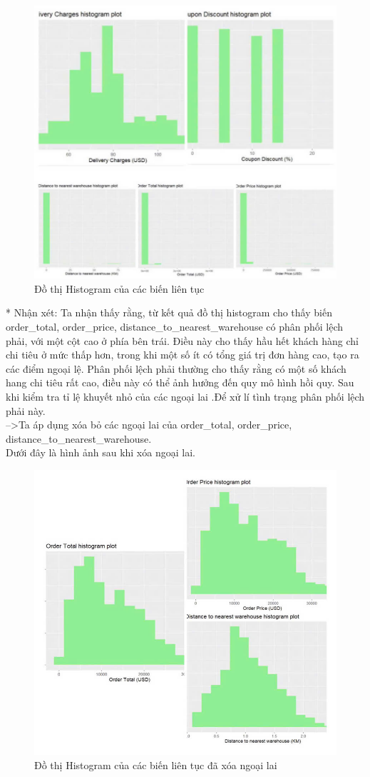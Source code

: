 \begin{figure}[H]
    \centering
    \includegraphics[width=0.7\linewidth]{graphics/bang7.jpg}
    \caption{Đồ thị Histogram của các biến liên tục}
  
\end{figure}
* Nhận xét: Ta nhận thấy rằng, từ kết quả đồ thị histogram cho thấy biến order\_total, order\_price, distance\_to\_nearest\_warehouse có phân phối lệch phải, với một cột cao ở phía bên trái. Điều này cho thấy hầu hết khách hàng chỉ chi tiêu ở mức thấp hơn, trong khi một số ít có tổng giá trị đơn hàng cao, tạo ra các điểm ngoại lệ. Phân phối lệch phải thường cho thấy  rằng có một số khách hang chi tiêu rất cao, điều này có thể ảnh hưởng đến quy mô hình hồi quy. Sau khi kiểm tra tỉ lệ khuyết nhỏ của các ngoại lai .Để xử lí tình trạng phân phối lệch phải này.\\
 -->Ta áp dụng xóa bỏ các ngoại lai  của order\_total, order\_price, distance\_to\_nearest\_warehouse.\\
 Dưới đây là hình ảnh sau khi xóa ngoại lai.
 \begin{figure}[H]
    \centering
    \includegraphics[width=0.7\linewidth]{graphics/bang8.jpg}
    \caption{Đồ thị Histogram của các biến liên tục đã xóa ngoại lai}
    
\end{figure}
